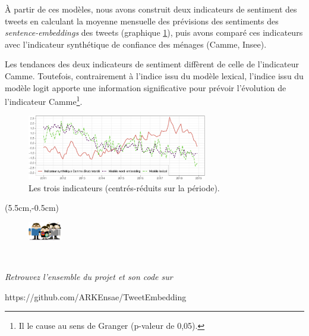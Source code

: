 \documentclass[10pt,french,french]{article}
\let\rmarkdownfootnote\footnote%
\def\footnote{\protect\rmarkdownfootnote}
\begin{document}
À partir de ces modèles, nous avons construit deux indicateurs de sentiment des tweets en calculant la moyenne mensuelle des prévisions des sentiments des \emph{sentence-embeddings} des tweets (graphique \ref{fig:bslogcam}), puis avons comparé ces indicateurs avec l'indicateur synthétique de confiance des ménages (Camme, Insee).

Les tendances des deux indicateurs de sentiment diffèrent de celle de l'indicateur Camme.
Toutefois, contrairement à l'indice issu du modèle lexical, l'indice issu du modèle logit apporte une information significative pour prévoir l'évolution de l'indicateur Camme\footnote{Il le cause au sens de Granger (p-valeur de 0,05).}.

\begin{figure}[!htp]
\begin{center}
\includegraphics[width =0.7\textwidth]{img/rmd-graphSentiments-1}
\captionsetup{margin=0cm,format=hang,justification=justified}
\caption{Les trois indicateurs (centrés-réduits sur la période).}\label{fig:bslogcam}
\end{center}
\end{figure}

\begin{textblock*}{\textwidth}(5.5cm,-0.5cm)
\begin{center}
\begin{minipage}{0.7\textwidth}

\begin{figure}
\includegraphics[height=0.8cm]{img/avatars.png}
\end{figure}

$\phantom{saut}$

\emph{Retrouvez l'ensemble du projet et son code sur}

https://github.com/ARKEnsae/TweetEmbedding

\end{minipage}
\end{center}

\end{textblock*}
\end{document}
